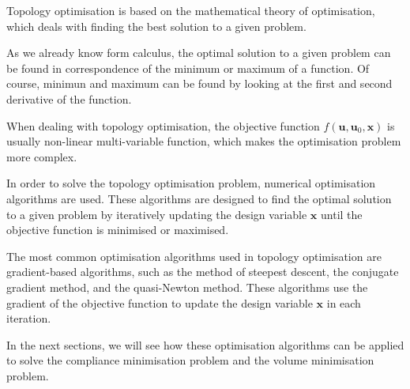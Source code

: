 Topology optimisation is based on the mathematical theory of optimisation, which deals with finding the best solution to a given problem.

As we already know form calculus, the optimal solution to a given problem can be found in correspondence of the minimum or maximum of a function.
Of course, minimun and maximum can be found by looking at the first and second derivative of the function.

When dealing with topology optimisation, the objective function $f(\bm{u}, \bm{u}_0, \bm{x})$ is usually non-linear multi-variable function, which makes the optimisation problem more complex.

In order to solve the topology optimisation problem, numerical optimisation algorithms are used.
These algorithms are designed to find the optimal solution to a given problem by iteratively updating the design variable $\bm{x}$ until the objective function is minimised or maximised.

The most common optimisation algorithms used in topology optimisation are gradient-based algorithms, such as the method of steepest descent, the conjugate gradient method, and the quasi-Newton method.
These algorithms use the gradient of the objective function to update the design variable $\bm{x}$ in each iteration.

In the next sections, we will see how these optimisation algorithms can be applied to solve the compliance minimisation problem and the volume minimisation problem.




